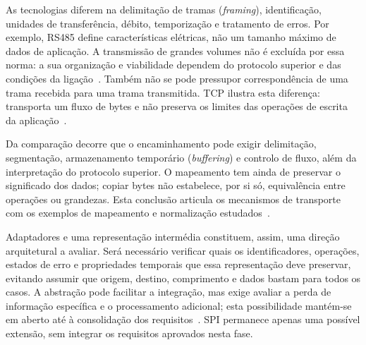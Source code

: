 As tecnologias diferem na delimitação de tramas (\textit{framing}),
identificação, unidades de transferência, débito, temporização e
tratamento de erros. Por exemplo, RS485 define características elétricas,
não um tamanho máximo de dados de aplicação. A transmissão de grandes
volumes não é excluída por essa norma: a sua organização e viabilidade
dependem do protocolo superior e das condições da
ligação~\cite{ti_rs485_an1057_2013,modbus_serial_2006}.
Também não se pode pressupor correspondência de uma trama recebida
para uma trama transmitida. TCP ilustra esta diferença: transporta
um fluxo de bytes e não preserva os limites das operações de escrita
da aplicação~\cite[sec.~3.7]{eddy_tcp_2022}.

Da comparação decorre que o encaminhamento pode exigir delimitação,
segmentação, armazenamento temporário (\textit{buffering}) e controlo
de fluxo, além da interpretação do protocolo superior. O mapeamento
tem ainda de preservar o significado dos dados; copiar bytes não
estabelece, por si só, equivalência entre operações ou grandezas.
Esta conclusão articula os mecanismos de transporte com os exemplos
de mapeamento e normalização
estudados~\cite{eddy_tcp_2022,castellanos_gateway_2021}.

Adaptadores e uma representação intermédia constituem, assim, uma
direção arquitetural a avaliar. Será necessário verificar quais os
identificadores, operações, estados de erro e propriedades temporais
que essa representação deve preservar, evitando assumir que origem,
destino, comprimento e dados bastam para todos os casos. A abstração
pode facilitar a integração, mas exige avaliar a perda de informação
específica e o processamento adicional; esta possibilidade mantém-se
em aberto até à consolidação dos requisitos~\cite{abdelwahed_gateway_2025}.
SPI permanece apenas uma possível extensão, sem integrar os requisitos
aprovados nesta fase.

